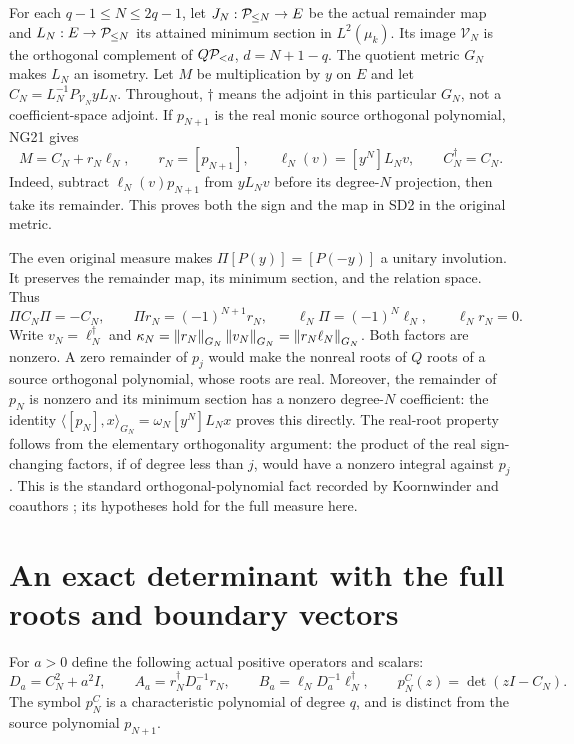 For each $q-1\le N\le2q-1$, let $J_N:\mathcal P_{\le N}\to E$ be the
actual remainder map and $L_N:E\to\mathcal P_{\le N}$ its attained minimum
section in $L^2(\mu_k)$. Its image $\mathcal V_N$ is the orthogonal
complement of $Q\mathcal P_{<d}$, $d=N+1-q$. The quotient metric $G_N$ makes
$L_N$ an isometry. Let $M$ be multiplication by $y$ on $E$ and let
$C_N=L_N^{-1}P_{\mathcal V_N}yL_N$. Throughout, $\dagger$ means the
adjoint in this particular $G_N$, not a coefficient-space adjoint.
If $p_{N+1}$ is the real monic source orthogonal polynomial, NG21 gives
\begin{equation}\tag{SD2}
M=C_N+r_N\ell_N,\qquad r_N=[p_{N+1}],\qquad
\ell_N(v)=[y^N]L_Nv,\qquad C_N^\dagger=C_N.
\end{equation}
Indeed, subtract $\ell_N(v)p_{N+1}$ from $yL_Nv$ before its degree-$N$
projection, then take its remainder. This proves both the sign and the
map in SD2 in the original metric.

The even original measure makes $\Pi[P(y)]=[P(-y)]$ a unitary involution.
It preserves the remainder map, its minimum section, and the relation
space. Thus
\begin{equation}\tag{SD3}
\Pi C_N\Pi=-C_N,\qquad
\Pi r_N=(-1)^{N+1}r_N,\qquad
\ell_N\Pi=(-1)^N\ell_N,\qquad \ell_Nr_N=0.
\end{equation}
Write $v_N=\ell_N^\dagger$ and
$\kappa_N=\left\lVert r_N\right\rVert_{G_N}\left\lVert v_N\right\rVert_{G_N}=\left\lVert r_N\ell_N\right\rVert_{G_N}$.
Both factors are nonzero. A zero remainder of $p_j$ would make the
nonreal roots of $Q$ roots of a source orthogonal polynomial, whose
roots are real. Moreover, the remainder of $p_N$ is nonzero and its
minimum section has a nonzero degree-$N$ coefficient: the identity
$\langle[p_N],x\rangle_{G_N}=\omega_N[y^N]L_Nx$ proves this directly.
The real-root property follows from the elementary orthogonality
argument: the product of the real sign-changing factors, if of degree
less than $j$, would have a nonzero integral against $p_j$. This is the
standard orthogonal-polynomial fact recorded by Koornwinder and
coauthors \cite{osd:DLMF}; its hypotheses hold for the full measure here.

\section{An exact determinant with the full roots and boundary vectors}
For $a>0$ define the following actual positive operators and scalars:
\begin{equation}\tag{SD4}
D_a=C_N^2+a^2I,\qquad
A_a=r_N^\dagger D_a^{-1}r_N,\qquad
B_a=\ell_ND_a^{-1}\ell_N^\dagger,\qquad
p_N^C(z)=\det(zI-C_N).
\end{equation}
The symbol $p_N^C$ is a characteristic polynomial of degree $q$, and
is distinct from the source polynomial $p_{N+1}$.

